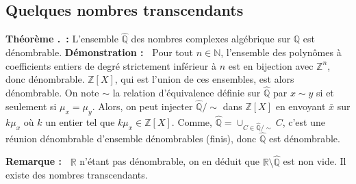 \documentclass[5pt,a4paper]{article}
\newcounter{thm}[section]
\renewcommand{\thethm}{\thesection.\arabic{thm}}
\newcommand{\thm}[1]{\stepcounter{thm}\noindent\textbf{Théorème \thethm ~:} #1 \newline}
\newcommand{\demo}[1]{\textbf{Démonstration :~} #1 \newline}
\newcommand{\rmq}[1]{\textbf{Remarque :~} #1 \newline}
\begin{document}
\begin{onehalfspacing}
\subsection{Quelques nombres transcendants}

\thm{L'ensemble $\hat{\mathbb{Q}}$ des nombres complexes algébrique sur $\mathbb{Q}$ est dénombrable.}
\demo{Pour tout $n \in \mathbb{N}$, l'ensemble des polynômes à coefficients entiers de degré strictement inférieur à $n$ est en bijection avec $\mathbb{Z}^{n}$, donc dénombrable. $\mathbb{Z}[X]$, qui est l'union de ces ensembles, est alors dénombrable. On note $\sim$ la relation d'équivalence définie sur $\hat{\mathbb{Q}}$ par $x \sim y$ si et seulement si $\mu_x = \mu _y$. Alors, on peut injecter $\hat{\mathbb{Q}}/\sim$ dans $\mathbb{Z}[X]$ en envoyant $\bar{x}$ sur $k\mu_x$ où $k$ un entier tel que $k\mu_x \in \mathbb{Z}[X]$. Comme, $\hat{\mathbb{Q}} = \cup_{C \in \hat{\mathbb{Q}}/ \sim} C$, c'est une réunion dénombrable d'ensemble dénombrables (finis), donc $\hat{\mathbb{Q}}$ est dénombrable.}

\rmq{$\mathbb{R}$ n'étant pas dénombrable, on en déduit que $\mathbb{R}\setminus \hat{\mathbb{Q}}$ est non vide. Il existe des nombres transcendants. }


\end{onehalfspacing}
\end{document}
